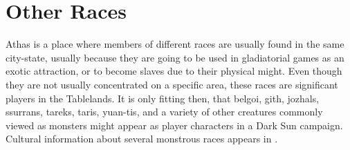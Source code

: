 
\section{Other Races}
Athas is a place where members of different races are usually found in the same city-state, usually because they are going to be used in gladiatorial games as an exotic attraction, or to become slaves due to their physical might. Even though they are not usually concentrated on a specific area, these races are significant players in the Tablelands. It is only fitting then, that belgoi, gith, jozhals, ssurrans, tareks, taris, yuan-tis, and a variety of other creatures commonly viewed as monsters might appear as player characters in a {\tableheader Dark Sun} campaign. Cultural information about several monstrous races appears in .
